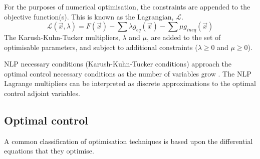 For the purposes of numerical optimisation, the constraints are appended to the objective function(s). This is known as the Lagrangian, $\mathcal{L}$.
\begin{equation} \label{eq:Lagrangian}
\mathcal{L}(\vec{x},\lambda) = F(\vec{x}) - \sum\lambda g_{eq}(\vec{x}) - \sum\mu g_{ineq}(\vec{x})
\end{equation}
The Karush-Kuhn-Tucker multipliers, $\lambda$ and $\mu$, are added to the set of optimisable parameters, and subject to additional constraints ($\lambda\ge0$ and $\mu\ge0$). %


%
%

NLP necessary conditions (Karush-Kuhn-Tucker conditions) approach the optimal control necessary conditions as the number of variables grow \parencite{Betts1998}. The NLP Lagrange multipliers can be interpreted as discrete approximations to the optimal control adjoint variables.

\subsection{Optimal control}

A common classification of optimisation techniques is based upon the differential equations that they optimise. 

